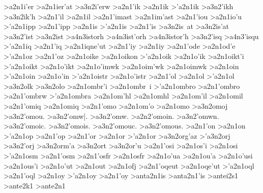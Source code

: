 {>a2n1i'er
>a2n1ier'at 		%
	>a3n2i'erw 		%
>a2n1'ik    		%
>a2n1ik
>'a2n1ik    		%
	>a3n2'ikh  		%
	>a3n2ik'h
>a2n1'il    		%
>a2n1il
>a2n1'imast 		%
>a2n1im'ast
>a2n1'iou   		%
>a2n1io'u
>'a2n1ipp   		%
>a2n1'ipp
>a2n1is     		%
>'a2n1is    		%
>a2n1'is
	>a3n2is~at  		%
	>a3n2is'at
	>a3n2'ist   		%
	>a3n2ist
		>a4n3istorh 		%
		>a4n3ist'orh 		%
		>a4n3istor'h
	>a3n2'isq   		%
		>a4n3'isqu 		%
>'a2n1iq     	   	%
>a2n1'iq
>a2n1iqne'ut 		%
>a2n1'iy    		%
>a2n1iy
>a2n1'ode   		%
>a2n1od'e
>'a2n1oz    		%
>a2n1'oz
>a2n1oike		%
>a2n1oikon  		%
>'a2n1oik   		%
>a2n1o'ik
>a2n1oikt'i  		%
>'a2n1oikt  		%
>a2n1o'ikt
>a2n1o'imwk 		%
>a2n1oim'wk
>a2n1oimwk  		%
>a2n1oin    		%
>'a2n1oin   		%
>a2n1o'in
>'a2n1oistr 		%
>a2n1o'istr
>a2n1'ol    		%
>a2n1ol
>'a2n1ol    		%
	>a3n2olk  		%
	>a3n2olo  		%
>a2n1ombr'i 		%
>a2n1ombr~i
>'a2n1ombro		%
>a2n1'ombro
>a2n1'ombrw
>'a2n1ombra
>a2n1om'hl  		%
>a2n1omhl
>a2n1om'il 		%
>a2n1omil
>a2n1'omiq 		%
>a2n1omiq
>a2n1'omo		%
>a2n1om'o
>a2n1omo    		%
	>a3n2omoj 		%
	>a3n2'omou. 		%
	>a3n2'omw|.
	>a3n2'omw.
	>a2n2'omoin.
	>a3n2'omwn.
	>a3n2'omoic.
	>a3n2'omois.
	>a3n2'omouc.
	>a3n2'omous.
>a2n1'on 		%
>a2n1on
>'a2n1op  		%
>a2n1'op
>a2n1'or     		%
>a2n1or
>'a2n1or     		%
	>a3n2org'az 		%
	>'a3n2orj   		%
	>a3n2'orj
	>a3n2orm'a  		%
	>a3n2ort    		%
	>a3n2or'u   		%
>a2n1'osi 		%
>a2n1os'i
>a2n1osi  		%
>'a2n1osm 		%
>a2n1'osm
>a2n1'osfr 		%
>a2n1osfr
>a2n1o'ua  		%
>a2n1ou'a
>a2n1o'usi 		%
>a2n1ous'i
>a2n1o'ut  		%
>a2n1out
>a2n1ofj   		%
>a2n1'oqeut 		%
>a2n1oqe'ut
>'a2n1oql  		%
>a2n1'oql
>a2n1oy    		%
>'a2n1oy   		%
>a2n1'oy
>anta2n1is  		%
>anta2n1'is 		%
>antei2s1   		%
>ante2k1    		%
>ante2n1    		%
}

